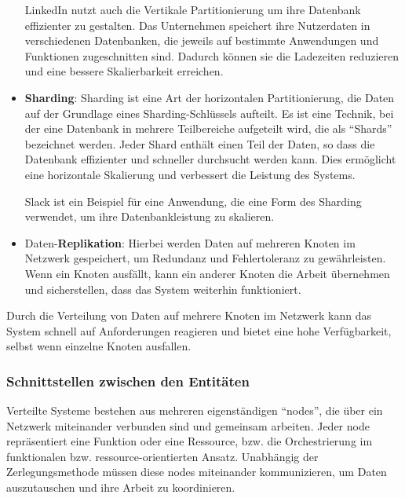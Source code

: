 \documentclass[../vs-script-first-v01.tex]{subfiles}
\begin{document}
\begin{itemize}
{LinkedIn nutzt auch die Vertikale Partitionierung um ihre Datenbank effizienter zu gestalten. Das Unternehmen speichert ihre Nutzerdaten in verschiedenen Datenbanken, die jeweils auf bestimmte Anwendungen und Funktionen zugeschnitten sind. Dadurch können sie die Ladezeiten reduzieren und eine bessere Skalierbarkeit erreichen.
}
\item \textbf{Sharding}:  Sharding ist eine Art der horizontalen Partitionierung, die Daten auf der Grundlage eines Sharding-Schlüssels aufteilt. Es ist eine Technik, bei der eine Datenbank in mehrere Teilbereiche aufgeteilt wird, die als \enquote{Shards} bezeichnet werden. Jeder Shard enthält einen Teil der Daten, so dass die Datenbank effizienter und schneller durchsucht werden kann. Dies ermöglicht eine horizontale Skalierung und verbessert die Leistung des Systems. 

Slack ist ein Beispiel für eine Anwendung, die eine Form des Sharding verwendet, um ihre Datenbankleistung zu skalieren. 
\item Daten-\textbf{Replikation}: Hierbei werden Daten auf mehreren Knoten im Netzwerk gespeichert, um Redundanz und Fehlertoleranz zu gewährleisten. Wenn ein Knoten ausfällt, kann ein anderer Knoten die Arbeit übernehmen und sicherstellen, dass das System weiterhin funktioniert.
\end{itemize}
 Durch die Verteilung von Daten auf mehrere Knoten im Netzwerk kann das System schnell auf Anforderungen reagieren und bietet eine hohe Verfügbarkeit, selbst wenn einzelne Knoten ausfallen.
\newpage
\subsubsection{Schnittstellen zwischen den Entitäten}

Verteilte Systeme bestehen aus mehreren eigenständigen \enquote{nodes}, die über ein Netzwerk miteinander verbunden sind und gemeinsam arbeiten. Jeder node repräsentiert eine Funktion oder eine Ressource, bzw. die Orchestrierung im funktionalen bzw. ressource-orientierten Ansatz. Unabhängig der Zerlegungsmethode müssen diese nodes miteinander kommunizieren, um Daten auszutauschen und ihre Arbeit zu koordinieren. 
\end{document}
